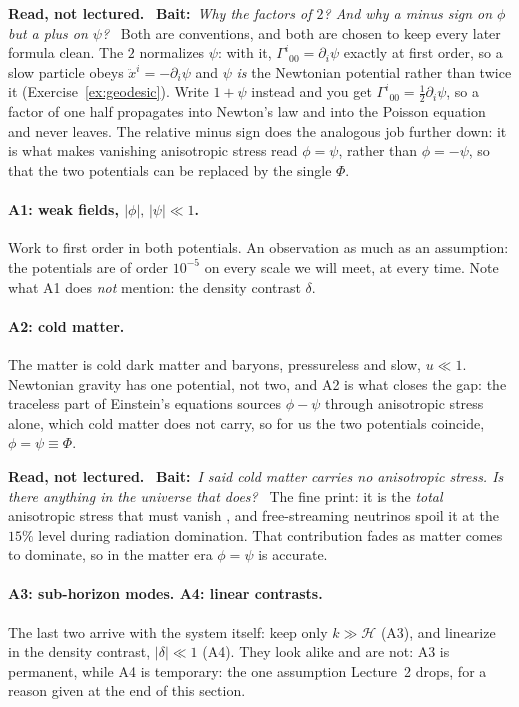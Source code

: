 \documentclass[a4paper,11pt]{article}
\def\cH{\mathcal{H}}
\numberwithin{equation}{section}
\newenvironment{reading}
  {\par\medskip\noindent\begingroup\small\color{black!58}%
   \textbf{Read, not lectured.}\ }
  {\endgroup\par\medskip}
\newcommand{\bait}[1]{\textbf{Bait:}\ \emph{#1}\ }
\begin{document}
\begin{reading}
\bait{Why the factors of $2$? And why a minus sign on $\phi$ but a plus on
$\psi$?}
Both are conventions, and both are chosen to keep every later formula clean.
The $2$ normalizes $\psi$: with it, $\Gamma^i{}_{00} = \partial_i\psi$ exactly at
first order, so a slow particle obeys $\ddot x^i = -\partial_i\psi$ and $\psi$
\emph{is} the Newtonian potential rather than twice it
(Exercise~\ref{ex:geodesic}). Write $1+\psi$ instead and you get
$\Gamma^i{}_{00} = \tfrac12\partial_i\psi$, so a factor of one half propagates
into Newton's law and into the Poisson equation and never leaves. The relative
minus sign does the analogous job further down: it is what makes vanishing
anisotropic stress read $\phi = \psi$, rather than $\phi = -\psi$, so that the
two potentials can be replaced by the single $\Phi$.
\end{reading}
\paragraph{A1: weak fields, $|\phi|,\,|\psi| \ll 1$.} Work to first order in
both potentials. An observation as much as an assumption: the potentials
are of order $10^{-5}$ on every scale we will meet, at every time. Note what A1
does \emph{not} mention: the density contrast $\delta$.

\paragraph{A2: cold matter.} The matter is cold dark matter and baryons, pressureless and slow, $u \ll 1$. Newtonian gravity has one
potential, not two, and A2 is what closes the gap: the traceless part of
Einstein's equations sources $\phi - \psi$ through anisotropic stress alone,
which cold matter does not carry, so for us the two potentials coincide,
$\phi = \psi \equiv \Phi$.
\begin{reading}
\bait{I said cold matter carries no anisotropic stress. Is there anything in the
universe that does?}
The fine print: it is the \emph{total} anisotropic stress that must vanish
\cite[Eq.~(23d)]{MaBertschinger1995}, and free-streaming neutrinos spoil it at
the $15\%$ level during radiation domination. That contribution fades as matter
comes to dominate, so in the matter era $\phi = \psi$ is accurate.
\end{reading}

\paragraph{A3: sub-horizon modes. A4: linear contrasts.} The last two arrive
with the system itself: keep only $k \gg \cH$ (A3), and linearize in the
density contrast, $|\delta| \ll 1$ (A4). They look alike and are not: A3 is
permanent, while A4 is temporary: the one assumption Lecture~2 drops, for a
reason given at the end of this section.
\end{document}
